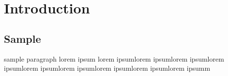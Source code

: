 \chapter{Introduction}
\section{Sample}
sample paragraph
\newpage
lorem ipsum lorem ipsumlorem ipsumlorem ipsumlorem ipsumlorem ipsumlorem ipsumlorem ipsumlorem ipsumlorem ipsumm
